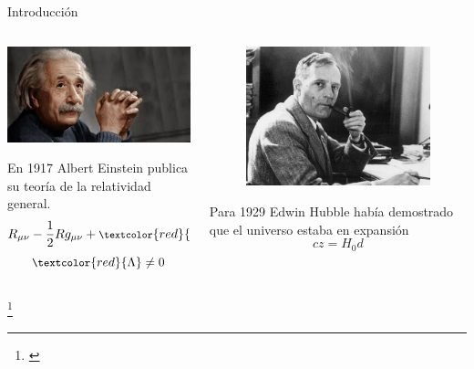 \documentclass[handout]{beamer}
\newcommand\blfootnote[1]
{%
	\begingroup
	\renewcommand\thefootnote{}\footnote{#1}%
	\addtocounter{footnote}{-1}%
	\endgroup
}
\newcommand{\fcite}[1]{\blfootnote{\cite{#1}}}
\begin{document}
\begin{frame}{Introducci\'on}
	\centering
	\begin{columns}
		\begin{column}{.5\textwidth}
			\includegraphics[width=\linewidth]{sources/images/einstein.jpg}
			
			En 1917 Albert Einstein publica su teoría de la relatividad general.
			\begin{equation}\footnotesize
				R_{\mu\nu} - \dfrac{1}{2}Rg_{\mu\nu} + \textcolor{red}{\Lambda} g_{\mu\nu} = \dfrac{8\pi G}{c^4}T_{\mu\nu}
			\end{equation}
			\begin{equation}\small
				\textcolor{red}{\Lambda} \neq 0
			\end{equation}
		\end{column}
		\begin{column}{.5\textwidth}
			\begin{figure}[h]
				\centering
				\includegraphics[width=0.6\linewidth]{sources/images/hubble.jpg}
			\end{figure}
			Para 1929 Edwin Hubble había demostrado que el universo estaba en expansión
			\begin{equation}
				cz = H_0d
			\end{equation}
		\end{column}
	\end{columns}
	\fcite{shirasaki2015probing}
\end{frame}
\end{document}
